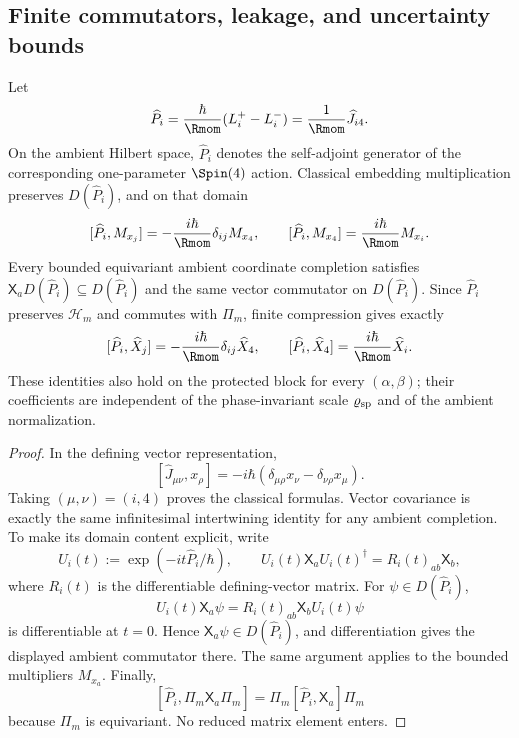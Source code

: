 \documentclass[12pt,a4paper]{article}
\begin{document}
\subsection{Finite commutators, leakage, and uncertainty bounds}

\begin{theorem}
\label{p2:thm:deformed-heisenberg}
\label{p2:prop:spinor-exact-commutators}
Let
\[
\widehat P_i=\frac{\hbar}{\Rmom}(L_i^+-L_i^-)
=\frac1{\Rmom}\widehat J_{i4}.
\]
On the ambient Hilbert space, \(\widehat P_i\) denotes the self-adjoint
generator of the corresponding one-parameter \(\Spin(4)\) action.  Classical
embedding multiplication preserves \(D(\widehat P_i)\), and on that domain
\[
[\widehat P_i,M_{x_j}]
=
-\frac{i\hbar}{\Rmom}\delta_{ij}M_{x_4},
\qquad
[\widehat P_i,M_{x_4}]
=
\frac{i\hbar}{\Rmom}M_{x_i}.
\]
Every bounded equivariant ambient coordinate completion satisfies
\(\mathsf X_aD(\widehat P_i)\subseteq D(\widehat P_i)\) and the same vector
commutator on \(D(\widehat P_i)\).  Since \(\widehat P_i\) preserves
\(\mathcal H_m\) and commutes
with \(\Pi_m\), finite compression gives exactly
\[
[\widehat P_i,\widehat X_j]
=
-\frac{i\hbar}{\Rmom}\delta_{ij}\widehat X_4,
\qquad
[\widehat P_i,\widehat X_4]
=
\frac{i\hbar}{\Rmom}\widehat X_i.
\]
These identities also hold on the protected block for every
\((\alpha,\beta)\); their coefficients are independent of the phase-invariant
scale \(\varrho_{\rm sp}\) and of the ambient normalization.
\end{theorem}

\begin{proof}
In the defining vector representation,
\[
[\widehat J_{\mu\nu},x_\rho]
=
-i\hbar(\delta_{\mu\rho}x_\nu-\delta_{\nu\rho}x_\mu).
\]
Taking \((\mu,\nu)=(i,4)\) proves the classical formulas.  Vector covariance
is exactly the same infinitesimal intertwining identity for any ambient
completion.  To make its domain content explicit, write
\[
U_i(t):=\exp(-it\widehat P_i/\hbar),\qquad
U_i(t)\mathsf X_aU_i(t)^\dagger
=R_i(t)_{ab}\mathsf X_b,
\]
where \(R_i(t)\) is the differentiable defining-vector matrix.  For
\(\psi\in D(\widehat P_i)\),
\[
U_i(t)\mathsf X_a\psi
=R_i(t)_{ab}\mathsf X_bU_i(t)\psi
\]
is differentiable at \(t=0\).  Hence
\(\mathsf X_a\psi\in D(\widehat P_i)\), and differentiation gives the
displayed ambient commutator there.  The same argument applies to the bounded
multipliers \(M_{x_a}\).  Finally,
\[
[\widehat P_i,\Pi_m\mathsf X_a\Pi_m]
=
\Pi_m[\widehat P_i,\mathsf X_a]\Pi_m
\]
because \(\Pi_m\) is equivariant.  No reduced matrix element enters.
\end{proof}
\end{document}
